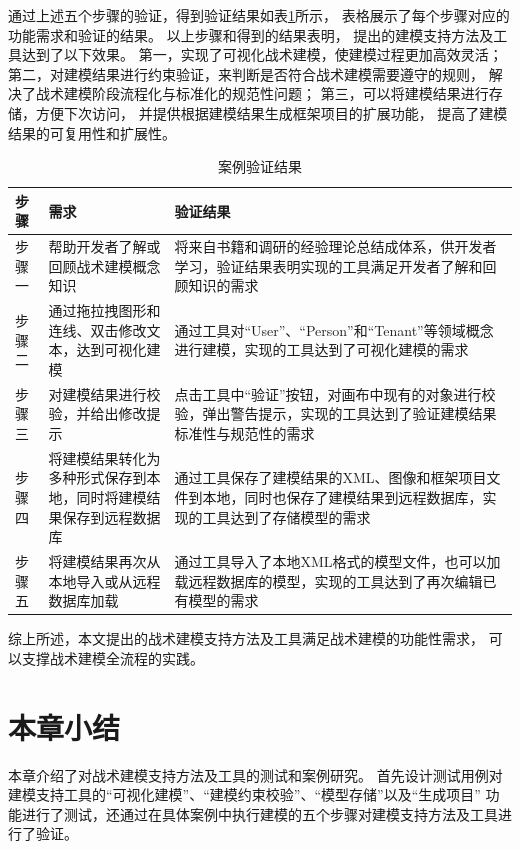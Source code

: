 通过上述五个步骤的验证，得到验证结果如表\ref{validationresult}所示，
表格展示了每个步骤对应的功能需求和验证的结果。
以上步骤和得到的结果表明，
提出的建模支持方法及工具达到了以下效果。
第一，实现了可视化战术建模，使建模过程更加高效灵活；
第二，对建模结果进行约束验证，来判断是否符合战术建模需要遵守的规则，
解决了战术建模阶段流程化与标准化的规范性问题；
第三，可以将建模结果进行存储，方便下次访问，
并提供根据建模结果生成框架项目的扩展功能，
提高了建模结果的可复用性和扩展性。

{\footnotesize
\begin{longtable}[h]{m{40pt}|m{95pt}|m{250pt}}
    \caption[案例验证结果]{案例验证结果} \label{validationresult} \\
        \hline  
        步骤&需求&验证结果\\
        \hline
        步骤一&帮助开发者了解或回顾战术建模概念知识&将来自书籍和调研的经验理论总结成体系，供开发者学习，验证结果表明实现的工具满足开发者了解和回顾知识的需求 \\
        \hline
        步骤二&通过拖拉拽图形和连线、双击修改文本，达到可视化建模&通过工具对“User”、“Person”和“Tenant”等领域概念进行建模，实现的工具达到了可视化建模的需求\\
        \hline
        步骤三&对建模结果进行校验，并给出修改提示&点击工具中“验证”按钮，对画布中现有的对象进行校验，弹出警告提示，实现的工具达到了验证建模结果标准性与规范性的需求 \\
        \hline
        步骤四&将建模结果转化为多种形式保存到本地，同时将建模结果保存到远程数据库&通过工具保存了建模结果的XML、图像和框架项目文件到本地，同时也保存了建模结果到远程数据库，实现的工具达到了存储模型的需求\\
        \hline
        步骤五&将建模结果再次从本地导入或从远程数据库加载&通过工具导入了本地XML格式的模型文件，也可以加载远程数据库的模型，实现的工具达到了再次编辑已有模型的需求\\
        \hline
\end{longtable} 
}

综上所述，本文提出的战术建模支持方法及工具满足战术建模的功能性需求，
可以支撑战术建模全流程的实践。




\section{本章小结}

本章介绍了对战术建模支持方法及工具的测试和案例研究。
首先设计测试用例对建模支持工具的“可视化建模”、“建模约束校验”、“模型存储”以及“生成项目”
功能进行了测试，还通过在具体案例中执行建模的五个步骤对建模支持方法及工具进行了验证。